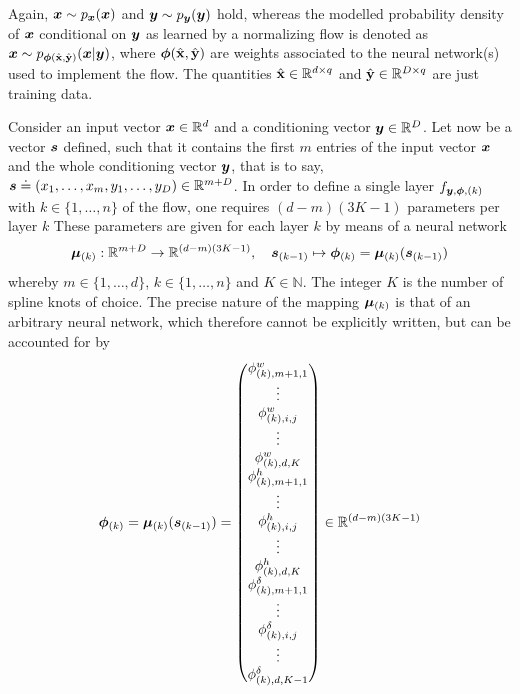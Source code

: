 \documentclass[a4paper,12pt]{report}
\begin{document}
Again, $\bm{x} \sim p_{\bm{x}}(\bm{x})$ and $\bm{y} \sim p_{\bm{y}}(\bm{y})$ hold, whereas the modelled probability density of $\bm{x}$ conditional on $\bm{y}$ as learned by a normalizing flow is denoted as $\bm{x} \sim p_{\bm{\phi}(\hat{\boldsymbol{\mathbf{x}}},\hat{\boldsymbol{\mathbf{y}}})}(\bm{x}|\bm{y})$, where $\bm{\phi}(\hat{\boldsymbol{\mathbf{x}}},\hat{\boldsymbol{\mathbf{y}}})$ are weights associated to the neural network(s) used to implement the flow. The quantities $\hat{\boldsymbol{\mathbf{x}}} \in \mathbb{R}^{d\times q}$ and $\hat{\boldsymbol{\mathbf{y}}} \in \mathbb{R}^{D \times q}$ are just training data.

Consider an input vector $\bm{x} \in \mathbb{R}^d$ and a conditioning vector $\bm{y} \in \mathbb{R}^D$. Let now be a vector $\bm{s}$ defined, such that it contains the first $m$ entries of the input vector $\bm{x}$ and the whole conditioning vector $\bm{y}$, that is to say, $\bm{s} \doteq (x_1,\dots,x_m,y_1,\dots,y_D) \in \mathbb{R}^{m+D}$. In order to define a single layer $f_{\bm{y},\bm{\phi},(k)}$ with $k \in \{1,\dots,n\}$ of the flow, one requires $(d-m)(3K-1)$ parameters per layer $k$ These parameters are given for each layer $k$ by means of a neural network \begin{equation}
\bm{\mu}_{(k)}: \mathbb{R}^{m+D}\rightarrow \mathbb{R}^{(d-m)(3K-1)}, \quad \bm{s}_{(k-1)} \mapsto \bm{\phi}_{(k)} = \bm{\mu}_{(k)}(\bm{s}_{(k-1)})
\end{equation} whereby $m \in \{1,\dots,d\}$, $k \in \{1,\dots,n\}$ and $K \in \mathbb{N}$. The integer $K$ is the number of spline knots of choice. The precise nature of the mapping $\bm{\mu}_{(k)}$ is that of an arbitrary neural network, which therefore cannot be explicitly written, but can be accounted for by
\begin{align}
\begin{aligned}
\bm{\phi}_{(k)} = \bm{\mu}_{(k)}(\bm{s}_{(k-1)}) = \begin{pmatrix}
\phi_{(k),m+1,1}^w \\
\vdots \\
\phi_{(k),i,j}^w \\
\vdots \\
\phi_{(k),d,K}^w \\
\phi_{(k),m+1,1}^h \\
\vdots \\
\phi_{(k),i,j}^h \\
\vdots \\
\phi_{(k),d,K}^h \\
\phi_{(k),m+1,1}^\delta \\
\vdots \\
\phi_{(k),i,j}^\delta \\
\vdots \\
\phi_{(k),d,K-1}^\delta \\
\end{pmatrix} \in \mathbb{R}^{(d-m)(3K-1)}
\end{aligned}
\end{align}
\end{document}
